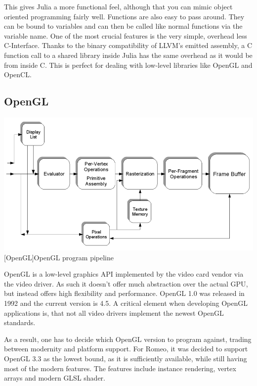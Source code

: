 This gives Julia a more functional feel, although that you can mimic object oriented programming fairly well.
Functions are also easy to pass around. They can be bound to variables and can then be called like normal functions via the variable name.
One of the most crucial features is the very simple, overhead less C-Interface. 
Thanks to the binary compatibility of LLVM's emitted assembly, a C function call to a shared library inside Julia has the same overhead as it would be from inside C\cite{CCALL}. 
This is perfect for dealing with low-level libraries like \ac{OpenGL} and \ac{OpenCL}.



\subsection{\ac{OpenGL}}


\vspace{1em}
\begin{minipage}{\linewidth}
    \centering
    \includegraphics[width=0.9\linewidth]{graphics/opengl.png}
    [OpenGL]{OpenGL program pipeline}
    \label{fig:opengl}
\end{minipage}


\ac{OpenGL} is a low-level graphics API implemented by the video card vendor via the video driver. 
As such it doesn't offer much abstraction over the actual \ac{GPU}, but instead offers high flexibility and performance.
\ac{OpenGL} 1.0 was released in 1992 and the current version is 4.5.
A critical element when developing \ac{OpenGL} applications is, that not all video drivers implement the newest \ac{OpenGL} standards.

As a result, one has to decide which \ac{OpenGL} version to program against, trading between modernity and platform support.
For Romeo, it was decided to support \ac{OpenGL} 3.3 as the lowest bound, as it is sufficiently available, while still having most of the modern features.
The features include instance rendering, vertex arrays and modern \ac{GLSL} shader.



